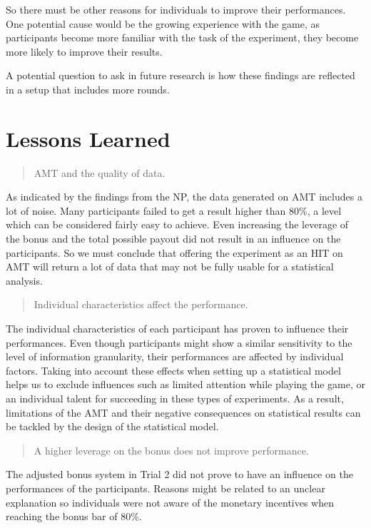 So there must be other reasons for individuals to improve their performances. One potential cause would be the growing experience with the game, as participants become more familiar with the task of the experiment, they become more likely to improve their results.

A potential question to ask in future research is how these findings are reflected in a setup that includes more rounds.

\section{Lessons Learned}
\begin{quote}
\acf{AMT} and the quality of data.
\end{quote}
As indicated by the findings from the \acl{NP}, the data generated on \ac{AMT} includes a lot of noise. Many participants failed to get a result higher than 80\%, a level which can be considered fairly easy to achieve. Even increasing the leverage of the bonus and the total possible payout did not result in an influence on the participants. So we must conclude that offering the experiment as an \ac{HIT} on \ac{AMT} will return a lot of data that may not be fully usable for a statistical analysis. 
\begin{quote}
Individual characteristics affect the performance.
\end{quote}
The individual characteristics of each participant has proven to influence their performances. Even though participants might show a similar sensitivity to the level of information granularity, their performances are affected by individual factors. Taking into account these effects when setting up a statistical model helps us to exclude influences such as limited attention while playing the game, or an individual talent for succeeding in these types of experiments. As a result, limitations of the \acl{AMT} and their negative consequences on statistical results can be tackled by the design of the statistical model.
\begin{quote}
A higher leverage on the bonus does not improve performance.
\end{quote}
The adjusted bonus system in Trial 2 did not prove to have an influence on the performances of the participants. Reasons might be related to an unclear explanation so individuals were not aware of the monetary incentives when reaching the bonus bar of 80\%.
